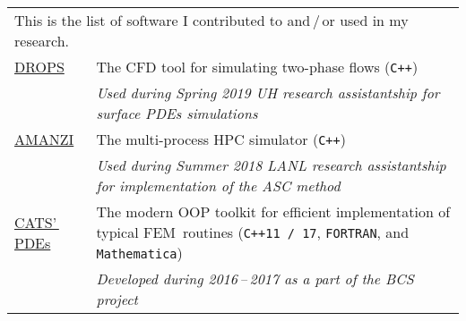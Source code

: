 \documentclass[a4paper,12pt]{article}
\begin{document}
	\begin{longtable}{ l >{\raggedright\arraybackslash}p{15cm} }
		\multicolumn{2}{p{17cm}}{This is the list of software I contributed to and\,/\,or used in my research.} \vspace{3mm}\\
		\href{https://www.igpm.rwth-aachen.de/DROPS/}{DROPS}
			& The CFD tool for simulating two-phase flows (\texttt{C++}) \vspace{1mm}\\
			& \textit{Used during Spring 2019 UH research assistantship for surface PDEs simulations} \vspace{3mm}\\
		\href{https://github.com/amanzi}{AMANZI}
			& The multi-process HPC simulator (\texttt{C++}) \vspace{1mm}\\
			& \textit{Used during Summer 2018 LANL research assistantship for implementation of the ASC method} \vspace{3mm}\\
		\href{https://github.com/CATSPDEs/}{CATS'\,PDEs}
			& The modern OOP toolkit for efficient implementation of typical FEM~routines (\texttt{C++11\,/\,17}, \texttt{FORTRAN}, and \texttt{Mathematica}) \vspace{1mm}\\
			& \textit{Developed during 2016\,--\,2017 as a part of the BCS project}
	\end{longtable}
	
	\vfill
	
	\begin{flushright}
		\small
	\end{flushright}
		
\end{document}
